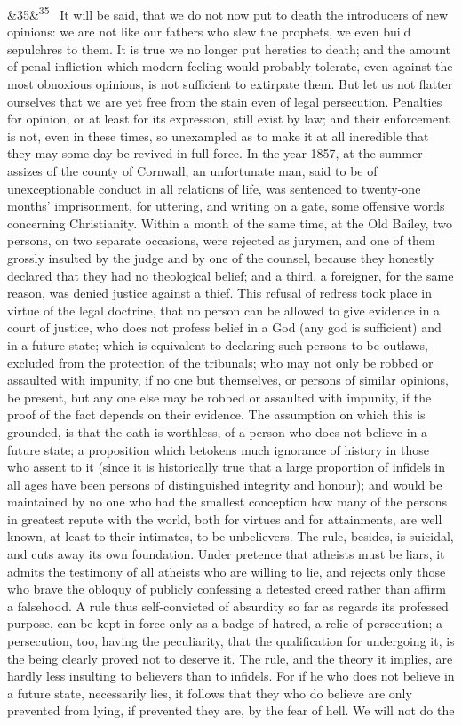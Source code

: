 \documentclass[12pt]{article}
\newcommand{\para}[1][]{\par\noindent\ifx&#1&\else\textsuperscript{\footnotesize #1}~\fi}
\begin{document}
\para[35] It will be said, that we do not now put to death the introducers of new opinions: we are not like our fathers who slew the prophets, we even build sepulchres to them. It is true we no longer put heretics to death; and the amount of penal infliction which modern feeling would probably tolerate, even against the most obnoxious opinions, is not sufficient to extirpate them. But let us not flatter ourselves that we are yet free from the stain even of legal persecution. Penalties for opinion, or at least for its expression, still exist by law; and their enforcement is not, even in these times, so unexampled as to make it at all incredible that they may some day be revived in full force. In the year 1857, at the summer assizes of the county of Cornwall, an unfortunate man, said to be of unexceptionable conduct in all relations of life, was sentenced to twenty-one months' imprisonment, for uttering, and writing on a gate, some offensive words concerning Christianity. Within a month of the same time, at the Old Bailey, two persons, on two separate occasions, were rejected as jurymen, and one of them grossly insulted by the judge and by one of the counsel, because they honestly declared that they had no theological belief; and a third, a foreigner, for the same reason, was denied justice against a thief. This refusal of redress took place in virtue of the legal doctrine, that no person can be allowed to give evidence in a court of justice, who does not profess belief in a God (any god is sufficient) and in a future state; which is equivalent to declaring such persons to be outlaws, excluded from the protection of the tribunals; who may not only be robbed or assaulted with impunity, if no one but themselves, or persons of similar opinions, be present, but any one else may be robbed or assaulted with impunity, if the proof of the fact depends on their evidence. The assumption on which this is grounded, is that the oath is worthless, of a person who does not believe in a future state; a proposition which betokens much ignorance of history in those who assent to it (since it is historically true that a large proportion of infidels in all ages have been persons of distinguished integrity and honour); and would be maintained by no one who had the smallest conception how many of the persons in greatest repute with the world, both for virtues and for attainments, are well known, at least to their intimates, to be unbelievers. The rule, besides, is suicidal, and cuts away its own foundation. Under pretence that atheists must be liars, it admits the testimony of all atheists who are willing to lie, and rejects only those who brave the obloquy of publicly confessing a detested creed rather than affirm a falsehood. A rule thus self-convicted of absurdity so far as regards its professed purpose, can be kept in force only as a badge of hatred, a relic of persecution; a persecution, too, having the peculiarity, that the qualification for undergoing it, is the being clearly proved not to deserve it. The rule, and the theory it implies, are hardly less insulting to believers than to infidels. For if he who does not believe in a future state, necessarily lies, it follows that they who do believe are only prevented from lying, if prevented they are, by the fear of hell. We will not do the 
\end{document}
